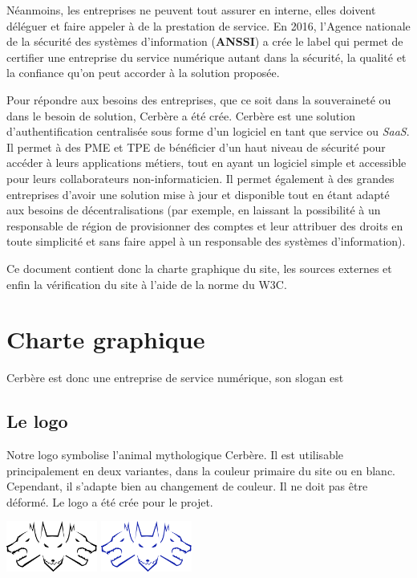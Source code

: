 \documentclass{article}
\begin{document}
Néanmoins, les entreprises ne peuvent tout assurer en interne, elles doivent déléguer et faire appeler à de la prestation de service. En 2016, l'Agence nationale de la sécurité des systèmes d'information (\textbf{ANSSI}) a crée le label  qui permet de certifier une entreprise du service numérique autant dans la sécurité, la qualité et la confiance qu'on peut accorder à la solution proposée.

Pour répondre aux besoins des entreprises, que ce soit dans la souveraineté ou dans le besoin de solution, Cerbère a été crée. Cerbère est une solution d'authentification centralisée sous forme d'un logiciel en tant que service ou \textit{SaaS}. Il permet à des PME et TPE de bénéficier d'un haut niveau de sécurité pour accéder à leurs applications métiers, tout en ayant un logiciel simple et accessible pour leurs collaborateurs non-informaticien. Il permet également à des grandes entreprises d'avoir une solution mise à jour et disponible tout en étant adapté aux besoins de décentralisations (par exemple, en laissant la possibilité à un responsable de région de provisionner des comptes et leur attribuer des droits en toute simplicité et sans faire appel à un responsable des systèmes d'information).

Ce document contient donc la charte graphique du site, les sources externes et enfin la vérification du site à l'aide de la norme du W3C.
\section{Charte graphique}
Cerbère est donc une entreprise de service numérique, son slogan est 
\subsection{Le logo}
Notre logo symbolise l'animal mythologique Cerbère. Il est utilisable principalement en deux variantes, dans la couleur primaire du site ou en blanc. Cependant, il s'adapte bien au changement de couleur. Il ne doit pas être déformé. Le logo a été crée pour le projet.
\bigskip
\begin{center}
    \includegraphics[width=3cm,keepaspectratio]{logo_black.png}
    \hspace{2cm}
    \includegraphics[width=3cm,keepaspectratio]{logo_nav.png}
\end{center}
\bigskip
\end{document}
